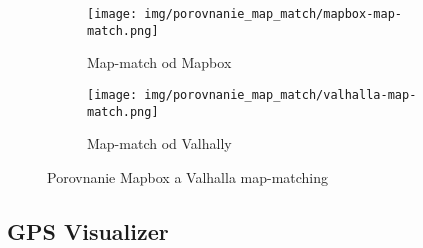 \begin{figure}[H]
  \centering
  \begin{subfigure}{.45\textwidth}
    \centering
    \texttt{[image: img/porovnanie\_map\_match/mapbox-map-match.png]}
    \caption{Map-match od Mapbox}
    \label{fig:mapbox-map-match}
  \end{subfigure}
  \begin{subfigure}{.45\textwidth}
    \centering
    \texttt{[image: img/porovnanie\_map\_match/valhalla-map-match.png]}
    \caption{Map-match od Valhally}
    \label{fig:valhalla-map-match}
  \end{subfigure}
  \caption{Porovnanie Mapbox a Valhalla map-matching}
  \label{fig:mapbox-map-match-vs-valhalla}
\end{figure}

\subsection{GPS Visualizer}

